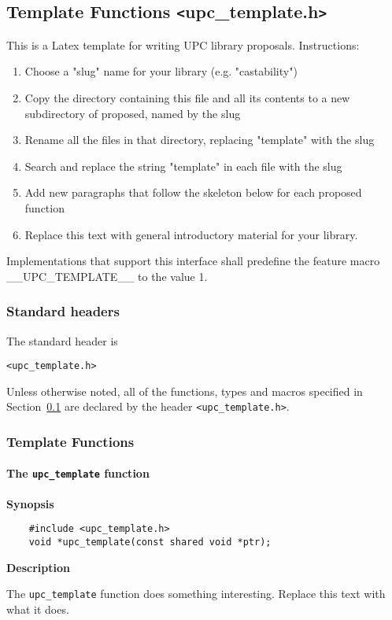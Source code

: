 \subsection{Template Functions \texttt{<}upc\_template.h\texttt{>}}
\label{upc-template}

\npf This is a Latex template for writing UPC library proposals. Instructions:
\begin{enumerate}
\item Choose a "slug" name for your library (e.g. "castability")
\item Copy the directory containing this file and all its contents to a new subdirectory of proposed, named by the slug
\item Rename all the files in that directory, replacing "template" with the slug
\item Search and replace the string "template" in each file with the slug
\item Add new paragraphs that follow the skeleton below for each proposed function
\item Replace this text with general introductory material for your library.
\end{enumerate}

\np Implementations that support this interface shall predefine the
feature macro {\_\_UPC\_TEMPLATE\_\_} to the value 1.

\subsubsection{Standard headers}

\npf The standard header is

{\tt <upc\_template.h>}

\np Unless otherwise noted, all of the functions, types and macros
specified in Section~\ref{upc-template}
are declared by the header {\tt <upc\_template.h>}.

\subsubsection{Template Functions}

\paragraph{The {\tt upc\_template} function}

{\bf Synopsis}

\npf\vspace{-2.5em}
\begin{verbatim}
    #include <upc_template.h>
    void *upc_template(const shared void *ptr);
\end{verbatim}

{\bf Description}

\np The {\tt upc\_template} function does something interesting.
Replace this text with what it does.


